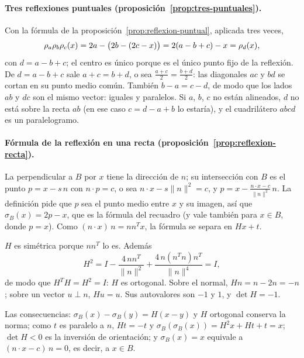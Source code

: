 \paragraph{Tres reflexiones puntuales (proposición~\ref{prop:tres-puntuales}).}
\begin{demostracion}
Con la fórmula de la proposición~\ref{prop:reflexion-puntual}, aplicada tres veces,
\[
  \rho_{a}\rho_{b}\rho_{c}(x)=2a-\bigl(2b-(2c-x)\bigr)=2(a-b+c)-x=\rho_{d}(x),
\]
con \(d=a-b+c\); el centro es único porque es el único punto fijo de la reflexión. De
\(d=a-b+c\) sale \(a+c=b+d\), o sea \(\frac{a+c}{2}=\frac{b+d}{2}\): las diagonales \(ac\) y
\(bd\) se cortan en su punto medio común. También \(b-a=c-d\), de modo que los lados \(ab\) y
\(dc\) son el mismo vector: iguales y paralelos. Si \(a\), \(b\), \(c\) no están alineados,
\(d\) no está sobre la recta \(ab\) (en ese caso \(c=d-a+b\) lo estaría), y el cuadrilátero
\(abcd\) es un paralelogramo.
\end{demostracion}

\paragraph{Fórmula de la reflexión en una recta (proposición~\ref{prop:reflexion-recta}).}
\begin{demostracion}
La perpendicular a \(B\) por \(x\) tiene la dirección de \(n\); su intersección con \(B\) es el
punto \(p=x-s\,n\) con \(n\cdot p=c\), o sea \(n\cdot x-s\lVert n\rVert^2=c\), y
\(p=x-\frac{n\cdot x-c}{\lVert n\rVert^2}\,n\).
La definición pide que \(p\) sea el punto medio entre \(x\) y su imagen, así que
\(\sigma_{B}(x)=2p-x\), que es la fórmula del recuadro (y vale también para \(x\in B\), donde
\(p=x\)). Como \((n\cdot x)\,n=nn^Tx\), la fórmula se separa en \(Hx+t\).

\(H\) es simétrica porque \(nn^T\) lo es. Además
\[
  H^2=I-\frac{4\,nn^T}{\lVert n\rVert^2}+\frac{4\,n(n^Tn)n^T}{\lVert n\rVert^4}=I,
\]
de modo que \(H^TH=H^2=I\): \(H\) es ortogonal. Sobre el normal, \(Hn=n-2n=-n\); sobre un
vector \(u\perp n\), \(Hu=u\). Sus autovalores son \(-1\) y \(1\), y \(\det H=-1\).

Las consecuencias: \(\sigma_{B}(x)-\sigma_{B}(y)=H(x-y)\) y \(H\) ortogonal conserva la norma; como
\(t\) es paralelo a \(n\), \(Ht=-t\) y
\(\sigma_{B}(\sigma_{B}(x))=H^2x+Ht+t=x\); \(\det H<0\) es la inversión de orientación; y
\(\sigma_{B}(x)=x\) equivale a \((n\cdot x-c)\,n=0\), es decir, a \(x\in B\).
\end{demostracion}

